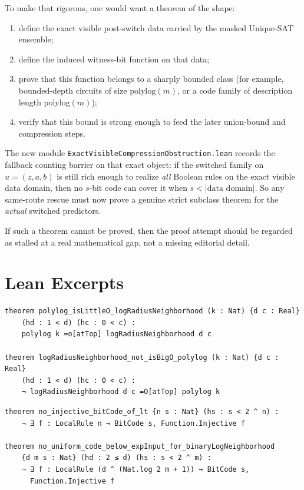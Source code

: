 \documentclass[11pt]{article}
\theoremstyle{remark}
\begin{document}
To make that rigorous, one would want a theorem of the shape:
\begin{enumerate}[leftmargin=1.5em]
  \item define the exact visible post-switch data carried by the masked Unique-SAT ensemble;
  \item define the induced witness-bit function on that data;
  \item prove that this function belongs to a sharply bounded class
  (for example, bounded-depth circuits of size \(\mathrm{polylog}(m)\), or a code family of
  description length \(\mathrm{polylog}(m)\));
  \item verify that this bound is strong enough to feed the later union-bound and compression steps.
\end{enumerate}

The new module \texttt{ExactVisibleCompressionObstruction.lean} records the
fallback counting barrier on that exact object: if the switched family on
\(u=(z,a,b)\) is still rich enough to realize \emph{all} Boolean rules on the
exact visible data domain, then no \(s\)-bit code can cover it when
\(s < |\text{data domain}|\).  So any same-route rescue must now prove a genuine
strict subclass theorem for the \emph{actual} switched predictors.

If such a theorem cannot be proved, then the proof attempt should be regarded as stalled at a real
mathematical gap, not a missing editorial detail.

\section{Lean Excerpts}

\begin{lstlisting}[caption={Core asymptotic obstruction}]
theorem polylog_isLittleO_logRadiusNeighborhood (k : Nat) {d c : Real}
    (hd : 1 < d) (hc : 0 < c) :
    polylog k =o[atTop] logRadiusNeighborhood d c

theorem logRadiusNeighborhood_not_isBigO_polylog (k : Nat) {d c : Real}
    (hd : 1 < d) (hc : 0 < c) :
    ¬ logRadiusNeighborhood d c =O[atTop] polylog k
\end{lstlisting}

\begin{lstlisting}[caption={Core counting obstruction}]
theorem no_injective_bitCode_of_lt {n s : Nat} (hs : s < 2 ^ n) :
    ¬ ∃ f : LocalRule n → BitCode s, Function.Injective f

theorem no_uniform_code_below_expInput_for_binaryLogNeighborhood
    {d m s : Nat} (hd : 2 ≤ d) (hs : s < 2 ^ m) :
    ¬ ∃ f : LocalRule (d ^ (Nat.log 2 m + 1)) → BitCode s,
      Function.Injective f
\end{lstlisting}
\end{document}
